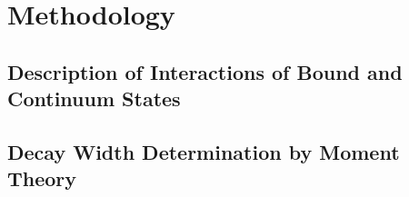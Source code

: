 \chapter{Methodology}
\section{Description of Interactions of Bound and Continuum States}
 
 
\section{Decay Width Determination by Moment Theory}
 

